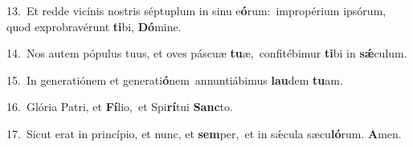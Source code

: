 {\numbfont\textcolor{\numbcolor}{13.}}~Et redde vicínis nostris séptuplum in sinu e\-\textbf{ó}\-rum:~\star impropérium ipsórum, quod exprobravérunt \textbf{ti}\-bi, \textbf{Dó}\-mine.\par
{\numbfont\textcolor{\numbcolor}{14.}}~Nos autem pópulus tuus, et oves páscuæ \textbf{tu}\-æ,~\star confitébimur \textbf{ti}\-bi in \textbf{sǽ}\-culum.\par
{\numbfont\textcolor{\numbcolor}{15.}}~In generatiónem et generati\-\textbf{ó}\-nem~\star annuntiábimus \textbf{lau}\-dem \textbf{tu}\-am.\par
{\numbfont\textcolor{\numbcolor}{16.}}~Glória Patri, et \textbf{Fí}\-lio,~\star et Spi\-\textbf{rí}\-tui \textbf{Sanc}\-to.\par
{\numbfont\textcolor{\numbcolor}{17.}}~Sicut erat in princípio, et nunc, et \textbf{sem}\-per,~\star et in sǽcula sæcu\-\textbf{ló}\-rum. \textbf{A}\-men.\par
